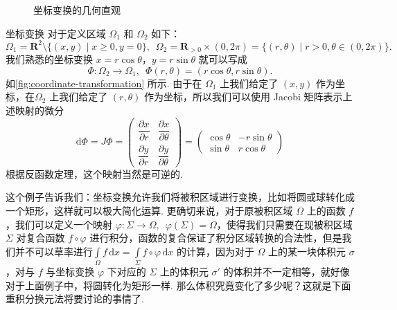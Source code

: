 \begin{figure}[hb]
    \centering
    \caption{坐标变换的几何直观}
    \label{fig:coordinate-transformation}
\end{figure}

\begin{example}{坐标变换}{}
    对于定义区域 $\Omega_1$ 和 $\Omega_2$ 如下：
    \[\Omega_1 = \mathbf{R}^2\setminus\{(x, y) \mid x\geqslant 0, y = 0\},\enspace \Omega_2 = \mathbf{R}_{>0}\times (0, 2\pi) = \{(r, \theta) \mid r>0, \theta\in(0, 2\pi)\}.\]
    我们熟悉的坐标变换 $x = r\cos\theta$，$y = r\sin\theta$ 就可以写成 \[\Phi\colon \Omega_2\to\Omega_1,\enspace \Phi(r, \theta) = (r\cos\theta, r\sin\theta).\]
    如\autoref{fig:coordinate-transformation} 所示. 由于在 $\Omega_1$ 上我们给定了 $(x, y)$ 作为坐标，在$\Omega_2$ 上我们给定了 $(r, \theta)$ 作为坐标，所以我们可以使用 Jacobi 矩阵表示上述映射的微分
    \[
        \mathrm{d}\Phi = J\Phi = \begin{pmatrix}
            \dfrac{\partial x}{\partial r} & \dfrac{\partial x}{\partial \theta} \\[2ex]
            \dfrac{\partial y}{\partial r} & \dfrac{\partial y}{\partial \theta}
        \end{pmatrix} = \begin{pmatrix}
            \cos\theta & -r\sin\theta \\
            \sin\theta & r\cos\theta
        \end{pmatrix}
    \]
    根据反函数定理，这个映射当然是可逆的.
\end{example}

这个例子告诉我们：坐标变换允许我们将被积区域进行变换，比如将圆或球转化成一个矩形，这样就可以极大简化运算. 更确切来说，对于原被积区域 $\Omega$ 上的函数 $f$，我们可以定义一个映射 $\varphi\colon \Sigma \to \Omega,\enspace \varphi(\Sigma) = \Omega$，使得我们只需要在现被积区域 $\Sigma$ 对复合函数 $f\circ\varphi$ 进行积分，函数的复合保证了积分区域转换的合法性，但是我们并不可以草率进行$\displaystyle\int\limits_{\Omega}f\,\mathrm{d}x = \int\limits_{\Sigma}f\circ \varphi\,\mathrm{d}x$ 的计算，因为对于 $\Omega$ 上的某一块体积元 $\sigma$，对与 $f$ 与坐标变换 $\varphi$ 下对应的 $\Sigma$ 上的体积元 $\sigma'$ 的体积并不一定相等，就好像对于上面例子中，将圆转化为矩形一样. 那么体积究竟变化了多少呢？这就是下面重积分换元法将要讨论的事情了.

